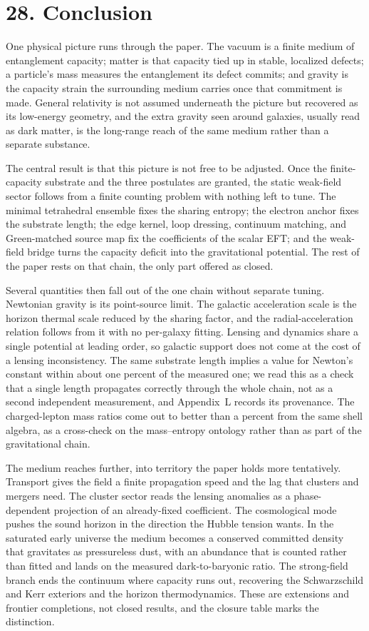 \documentclass[11pt]{article}
\begin{document}
\section{28. Conclusion}

One physical picture runs through the paper. The vacuum is a finite medium of entanglement capacity; matter is that capacity tied up in stable, localized defects; a particle's mass measures the entanglement its defect commits; and gravity is the capacity strain the surrounding medium carries once that commitment is made. General relativity is not assumed underneath the picture but recovered as its low-energy geometry, and the extra gravity seen around galaxies, usually read as dark matter, is the long-range reach of the same medium rather than a separate substance.

The central result is that this picture is not free to be adjusted. Once the finite-capacity substrate and the three postulates are granted, the static weak-field sector follows from a finite counting problem with nothing left to tune. The minimal tetrahedral ensemble fixes the sharing entropy; the electron anchor fixes the substrate length; the edge kernel, loop dressing, continuum matching, and Green-matched source map fix the coefficients of the scalar EFT; and the weak-field bridge turns the capacity deficit into the gravitational potential. The rest of the paper rests on that chain, the only part offered as closed.

Several quantities then fall out of the one chain without separate tuning. Newtonian gravity is its point-source limit. The galactic acceleration scale is the horizon thermal scale reduced by the sharing factor, and the radial-acceleration relation follows from it with no per-galaxy fitting. Lensing and dynamics share a single potential at leading order, so galactic support does not come at the cost of a lensing inconsistency. The same substrate length implies a value for Newton's constant within about one percent of the measured one; we read this as a check that a single length propagates correctly through the whole chain, not as a second independent measurement, and Appendix~L records its provenance. The charged-lepton mass ratios come out to better than a percent from the same shell algebra, as a cross-check on the mass--entropy ontology rather than as part of the gravitational chain.

The medium reaches further, into territory the paper holds more tentatively. Transport gives the field a finite propagation speed and the lag that clusters and mergers need. The cluster sector reads the lensing anomalies as a phase-dependent projection of an already-fixed coefficient. The cosmological mode pushes the sound horizon in the direction the Hubble tension wants. In the saturated early universe the medium becomes a conserved committed density that gravitates as pressureless dust, with an abundance that is counted rather than fitted and lands on the measured dark-to-baryonic ratio. The strong-field branch ends the continuum where capacity runs out, recovering the Schwarzschild and Kerr exteriors and the horizon thermodynamics. These are extensions and frontier completions, not closed results, and the closure table marks the distinction.
\end{document}
